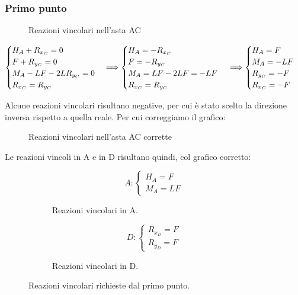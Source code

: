 \documentclass[main.tex]{subfiles}
\begin{document}
\subsubsection{Primo punto}
\begin{figure}[H]
\centering
\resizebox{.5\textwidth}{!}{}
\caption{Reazioni vincolari nell'asta AC}
\end{figure}

\[
	\begin{cases}
		H_A + R_{x_C} = 0\\
		F + R_{y_C} = 0\\
		M_A - LF - 2LR_{y_C} = 0\\
		R_{x_C} = R_{y_C}
	\end{cases}
	\Longrightarrow
	\begin{cases}
		H_A = -R_{x_C}\\
		F = -R_{y_C}\\
		M_A = LF - 2LF = -LF\\
		R_{x_C} = R_{y_C}
	\end{cases}
	\\
	\Longrightarrow
	\begin{cases}
		H_A = F\\
		M_A =  -LF\\
		R_{y_C}= -F\\
		R_{x_C} = -F
	\end{cases}
\]

Alcune reazioni vincolari risultano negative, per cui è stato scelto la direzione inversa rispetto a quella reale. Per cui correggiamo il grafico:

\begin{figure}[H]
\centering
\resizebox{.5\textwidth}{!}{}
\caption{Reazioni vincolari nell'asta AC corrette}
\end{figure}

Le reazioni vincoli in A e in D risultano quindi, col grafico corretto:

\begin{figure}[H]
  \begin{subfigure}[b]{.5\textwidth}
  \centering
  \[
  	A: \begin{cases}
		H_A = F\\
		M_A = LF
  	\end{cases}
  \]
  \caption{Reazioni vincolari in A.}
  \end{subfigure}
  \hfill
  \begin{subfigure}[b]{.5\textwidth}
  \centering
  \[
  	D: \begin{cases}
  		R_{x_D} = F\\
  		R_{y_D} = F
  	\end{cases}
  \]
  \caption{Reazioni vincolari in D.}
  \end{subfigure}
  \caption{Reazioni vincolari richieste dal primo punto.}
\end{figure}
\end{document}
